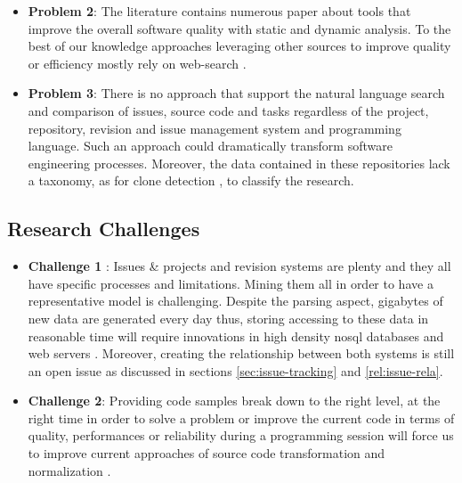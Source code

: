 \begin{itemize}
	\item {\bf Problem 2}: The literature contains numerous paper about tools that improve the overall software quality with static \cite{Dangel2000, burn2003checkstyle, Hovemeyer2007, Moha2010} and dynamic \cite{Nayrolles,Nayrolles2013a,Palma2013} analysis. To the best of our knowledge approaches leveraging other sources to improve quality or efficiency mostly rely on web-search \cite{Brandt2009,Rahman2013,Montandon2013}.

	\item {\bf Problem 3}: There is no approach that support the natural language search and comparison of issues, source code and tasks regardless of the project, repository, revision and issue management system and programming language. Such an approach could dramatically transform software engineering processes. Moreover, the data contained in these repositories lack a taxonomy, as for clone detection \cite{CoryKapser}, to classify the research.
\end{itemize}

\subsection{Research Challenges\label{sec:challenges}}

\begin{itemize}
	\item {\bf Challenge 1} : Issues \& projects and revision systems are plenty and they all have specific processes and limitations. Mining them all in order to have a representative model is challenging. Despite the parsing aspect, gigabytes of new data are generated every day thus, storing accessing to these data in reasonable time will require innovations in high density nosql databases \cite{Nayrolles2014b} and web servers \cite{Nayrolles2013b,Nayrolles2014c}. Moreover, creating the relationship between both systems is still an open issue as discussed in sections \ref{sec:issue-tracking} and \ref{rel:issue-rela}.

	\item {\bf Challenge 2}: Providing code samples break down to the right level, at the right time in order to solve a problem  or improve the current code in terms of quality, performances or reliability during a programming session will force us to improve current approaches of source code transformation and normalization \cite{Cordy2006a, Cordy2006, Roy2008, Cordy2011}.
\end{itemize}

